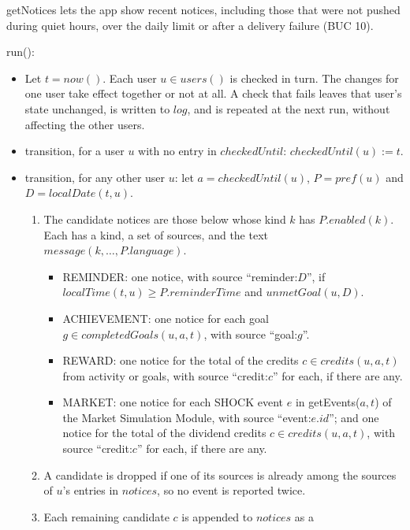 \documentclass[12pt, titlepage]{article}
\begin{document}
\noindent getNotices lets the app show recent notices, including those that
were not pushed during quiet hours, over the daily limit or after a delivery
failure (BUC 10).

\medskip

\noindent run():
\begin{itemize}
\item Let $t = \mathit{now}()$. Each user $u \in \mathit{users}()$ is checked
  in turn. The changes for one user take effect together or not at all. A
  check that fails leaves that user's state unchanged, is written to
  $\mathit{log}$, and is repeated at the next run, without affecting the other
  users.
\item transition, for a user $u$ with no entry in $\mathit{checkedUntil}$:
  $\mathit{checkedUntil}(u) := t$.
\item transition, for any other user $u$: let $a =
  \mathit{checkedUntil}(u)$, $P = \mathit{pref}(u)$ and $D =
  \mathit{localDate}(t, u)$.
  \begin{enumerate}
  \item The candidate notices are those below whose kind $k$ has
    $P.\mathit{enabled}(k)$. Each has a kind, a set of sources, and the text
    $\mathit{message}(k, \ldots, P.\mathit{language})$.
    \begin{itemize}
    \item REMINDER: one notice, with source ``reminder:$D$'', if
      $\mathit{localTime}(t, u) \geq P.\mathit{reminderTime}$ and
      $\mathit{unmetGoal}(u, D)$.
    \item ACHIEVEMENT: one notice for each goal $g \in
      \mathit{completedGoals}(u, a, t)$, with source ``goal:$g$''.
    \item REWARD: one notice for the total of the credits $c \in
      \mathit{credits}(u, a, t)$ from activity or goals, with source
      ``credit:$c$'' for each, if there are any.
    \item MARKET: one notice for each SHOCK event $e$ in
      getEvents($a, t$) of the Market Simulation Module, with source
      ``event:$e.\mathit{id}$''; and one notice for the total of the dividend
      credits $c \in \mathit{credits}(u, a, t)$, with source ``credit:$c$''
      for each, if there are any.
    \end{itemize}
  \item A candidate is dropped if one of its sources is already among the
    sources of $u$'s entries in $\mathit{notices}$, so no event is reported
    twice.
  \item Each remaining candidate $c$ is appended to $\mathit{notices}$ as a

\end{enumerate}
\end{itemize}
\end{document}
